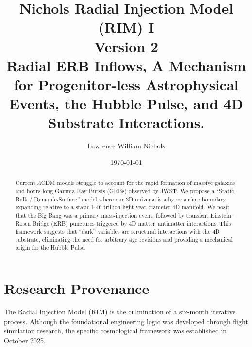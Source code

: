 \documentclass[12pt]{article}
\title{%
Nichols Radial Injection Model (RIM) I\\ Version 2\\ Radial ERB Inflows, A Mechanism for Progenitor-less Astrophysical Events, the Hubble Pulse, and 4D Substrate Interactions.
}
\author{Lawrence William Nichols}
\date{\today}
\begin{document}
\maketitle

\begin{abstract}
Current $\Lambda$CDM models struggle to account for the rapid formation of massive galaxies and hours-long Gamma-Ray Bursts (GRBs) observed by JWST. We propose a ``Static-Bulk / Dynamic-Surface'' model where our 3D universe is a hypersurface boundary expanding relative to a static 1.46 trillion light-year diameter 4D manifold. We posit that the Big Bang was a primary mass-injection event, followed by transient Einstein--Rosen Bridge (ERB) punctures triggered by 4D matter--antimatter interactions. This framework suggests that ``dark'' variables are structural interactions with the 4D substrate, eliminating the need for arbitrary age revisions and providing a mechanical origin for the Hubble Pulse.
\end{abstract}

\section*{Research Provenance}
The Radial Injection Model (RIM) is the culmination of a six-month iterative process. Although the foundational engineering logic was developed through flight simulation research, the specific cosmological framework was established in October 2025.
\newpage
\end{document}
